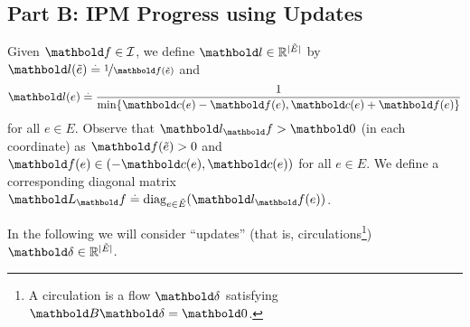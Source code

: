\documentclass{tufte-handout}
\newcommand{\Etil}{\Tilde{E}}
\newcommand{\etil}{\Tilde{e}}
\newcommand{\barrierflowset}{\mathcal{I}}
\begin{document}
\subsection{Part B: IPM Progress using Updates}

Given $\vf \in \barrierflowset$, we define $\vl \in \R^{|\Etil|}$ by $\vl(\etil) \defeq \nicefrac{1}{\vf(\etil)}$ and \begin{align*}
    \vl(e) \defeq \frac{1}{\min\{\vc(e) - \vf(e), \vc(e) + \vf(e)\}}
\end{align*} for all $e \in E$. Observe that $\vl_\vf > \vZero$ (in each coordinate) as $\vf(\etil) > 0$ and $\vf(e) \in (-\vc(e), \vc(e))$ for all $e \in E$. We define a corresponding diagonal matrix $\mL_\vf \defeq \diag_{e \in \Etil}(\vl_\vf(e))$.

In the following we will consider ``updates'' (that is, circulations\footnote{A circulation is a flow $\vdelta$ satisfying $\mB\vdelta = \vZero$.}) $\vdelta \in \R^{|\Etil|}$.
\end{document}
